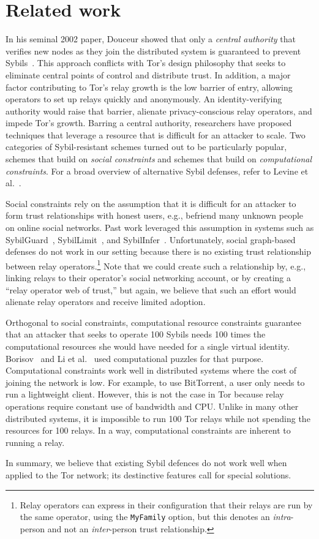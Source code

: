 \section{Related work}
\label{sec:related_work}
In his seminal 2002 paper, Douceur showed that only a \emph{central authority}
that verifies new nodes as they join the distributed system is guaranteed to
prevent Sybils~\cite{Douceur2002a}.  This approach conflicts with Tor's design
philosophy that seeks to eliminate central points of control and distribute
trust.  In addition, a major factor contributing to Tor's relay growth is the
low barrier of entry, allowing operators to set up relays quickly and
anonymously.  An identity-verifying authority would raise that barrier, alienate
privacy-conscious relay operators, and impede Tor's growth.  Barring a central
authority, researchers have proposed techniques that leverage a resource that is
difficult for an attacker to scale.  Two categories of Sybil-resistant schemes
turned out to be particularly popular, schemes that build on \emph{social
constraints} and schemes that build on \emph{computational constraints}.  For a
broad overview of alternative Sybil defenses, refer to Levine et
al.~\cite{Levine2006a}.

Social constraints rely on the assumption that it is difficult for an attacker
to form trust relationships with honest users, e.g., befriend many unknown
people on online social networks.  Past work leveraged this assumption in
systems such as SybilGuard~\cite{Yu2006a}, SybilLimit~\cite{Yu2008a}, and
SybilInfer~\cite{Danezis2009a}.  Unfortunately, social graph-based defenses
do not work in our setting because there is no existing trust relationship
between relay operators.\footnote{Relay operators can express in their
configuration that their relays are run by the same operator, using the
\texttt{MyFamily} option, but this denotes an \emph{intra}-person and not an
\emph{inter}-person trust relationship.} Note that we could create such a
relationship by, e.g., linking relays to their operator's social networking
account, or by creating a ``relay operator web of trust,'' but again, we
believe that such an effort would alienate relay operators and receive limited
adoption.

Orthogonal to social constraints, computational resource constraints guarantee
that an attacker that seeks to operate 100 Sybils needs 100 times the
computational resources she would have needed for a single virtual identity.
Borisov~\cite{Borisov2006a} and Li et al.~\cite{Li2012a} used computational
puzzles for that purpose.  Computational constraints work well in distributed
systems where the cost of joining the network is low.  For example, to use
BitTorrent, a user only needs to run a lightweight client.  However, this is not
the case in Tor because relay operations require constant use of bandwidth and
CPU.  Unlike in many other distributed systems, it is impossible to run 100 Tor
relays while not spending the resources for 100 relays.  In a way, computational
constraints are inherent to running a relay.

In summary, we believe that existing Sybil defences do not work well when
applied to the Tor network; its destinctive features call for special solutions.
